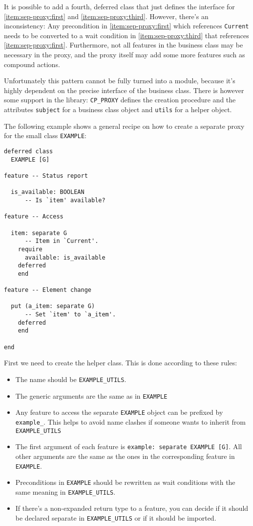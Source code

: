 \documentclass[a4paper,10pt]{report}
\begin{document}

It is possible to add a fourth, deferred class that just defines the interface for \ref{item:sep-proxy:first} and \ref{item:sep-proxy:third}.
However, there's an inconsistency: 
Any precondition in \ref{item:sep-proxy:first} which references \lstinline!Current! needs to be converted to a wait condition in \ref{item:sep-proxy:third} that references \ref{item:sep-proxy:first}.
Furthermore, not all features in the business class may be necessary in the proxy, and the proxy itself may add some more features such as compound actions.

Unfortunately this pattern cannot be fully turned into a module, because it's highly dependent on the precise interface of the business class.
There is however some support in the library: 
\lstinline!CP_PROXY! defines the creation procedure and the attributes \lstinline!subject! for a business class object and \lstinline!utils! for a helper object.

The following example shows a general recipe on how to create a separate proxy for the small class \lstinline!EXAMPLE!:

\begin{lstlisting}
deferred class
  EXAMPLE [G]

feature -- Status report

  is_available: BOOLEAN
      -- Is `item' available?
  
feature -- Access

  item: separate G
      -- Item in `Current'.
    require
      available: is_available
    deferred
    end

feature -- Element change

  put (a_item: separate G)
      -- Set `item' to `a_item'.
    deferred
    end

end
\end{lstlisting}

First we need to create the helper class.
This is done according to these rules:
 \begin{itemize}
  \item The name should be \lstinline!EXAMPLE_UTILS!.
  \item The generic arguments are the same as in \lstinline!EXAMPLE!
  \item Any feature to access the separate \lstinline!EXAMPLE! object can be prefixed by \lstinline!example_!.
  This helps to avoid name clashes if someone wants to inherit from \lstinline!EXAMPLE_UTILS!
  \item The first argument of each feature is \lstinline!example: separate EXAMPLE [G]!.
  All other arguments are the same as the ones in the corresponding feature in \lstinline!EXAMPLE!.
  \item Preconditions in \lstinline!EXAMPLE! should be rewritten as wait conditions with the same meaning in \lstinline!EXAMPLE_UTILS!.
  \item If there's a non-expanded return type to a feature, you can decide if it should be declared separate in \lstinline!EXAMPLE_UTILS! or if it should be imported.
 \end{itemize}
\end{document}

